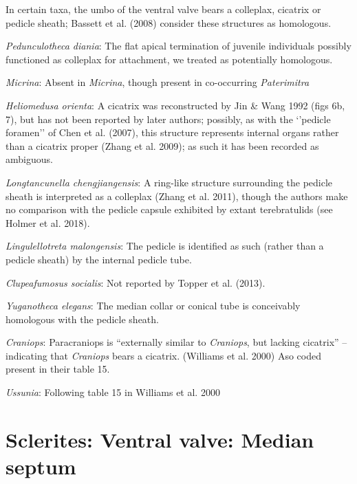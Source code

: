 \documentclass[]{book}
\theoremstyle{definition}
\theoremstyle{definition}
\theoremstyle{definition}
\theoremstyle{remark}
\begin{document}
In certain taxa, the umbo of the ventral valve bears a colleplax,
cicatrix or pedicle sheath; Bassett et al. (2008) consider these
structures as homologous.

\emph{Pedunculotheca diania}: The flat apical termination of juvenile
individuals possibly functioned as colleplax for attachment, we treated
as potentially homologous.

\emph{Micrina}: Absent in \emph{Micrina}, though present in co-occurring
\emph{Paterimitra}

\emph{Heliomedusa orienta}: A cicatrix was reconstructed by Jin \& Wang
1992 (figs 6b, 7), but has not been reported by later authors; possibly,
as with the `'pedicle foramen'' of Chen et al. (2007), this structure
represents internal organs rather than a cicatrix proper (Zhang et al.
2009); as such it has been recorded as ambiguous.

\emph{Longtancunella chengjiangensis}: A ring-like structure surrounding
the pedicle sheath is interpreted as a colleplax (Zhang et al. 2011),
though the authors make no comparison with the pedicle capsule exhibited
by extant terebratulids (see Holmer et al. 2018).

\emph{Lingulellotreta malongensis}: The pedicle is identified as such
(rather than a pedicle sheath) by the internal pedicle tube.

\emph{Clupeafumosus socialis}: Not reported by Topper et al. (2013).

\emph{Yuganotheca elegans}: The median collar or conical tube is
conceivably homologous with the pedicle sheath.

\emph{Craniops}: Paracraniops is ``externally similar to
\emph{Craniops}, but lacking cicatrix'' -- indicating that
\emph{Craniops} bears a cicatrix. (Williams et al. 2000) Aso coded
present in their table 15.

\emph{Ussunia}: Following table 15 in Williams et al. 2000

\hypertarget{sclerites-ventral-valve-median-septum}{%
\section*{Sclerites: Ventral valve: Median
septum}\label{sclerites-ventral-valve-median-septum}}
\end{document}
